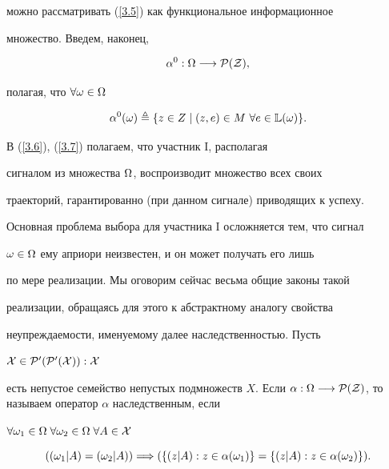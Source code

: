 можно рассматривать (\ref{3.5}) как функциональное информационное


множество. Введем, наконец,


\begin{equation}\label{3.6}


{{\alpha}^0}:\Om \lo \cal{P}(Z),


\end{equation}


полагая, что $\forall{\omega} \in \Omega$


\begin{equation}\label{3.7}


{{\alpha}^0}(\omega) \triangleq \{z \in Z \mid (z,e) \in M \ \fo{e} \in


\Bbb{L}(\omega)\}.


\end{equation}


В (\ref{3.6}), (\ref{3.7}) полагаем, что участник I, располагая


сигналом из множества $\Omega$, воспроизводит множество всех своих


траекторий, гарантированно (при данном сигнале) приводящих к успеху.


Основная проблема выбора для участника I осложняется тем, что сигнал


$\omega \in \Omega$ ему априори неизвестен, и он может получать его лишь


по мере реализации. Мы оговорим сейчас весьма общие законы такой


реализации, обращаясь для этого к абстрактному аналогу свойства


неупреждаемости, именуемому далее наследственностью. Пусть


$\cal{X} \in {\cal{P}}'({\cal{P}}'(X)):\cal{X}$


есть непустое семейство непустых подмножеств $X$. Если $\alpha:\Om \lo


\cal{P}(Z)$, то называем оператор $\alpha$ наследственным, если


$\forall{{\omega}_1} \in \Omega\;\forall{{\omega}_2} \in \Omega\;\forall{A} \in\cal{X}$


\begin{equation}\label{3.8}


(({{\omega}_1} \vert A) = ({{\omega}_2} \vert A)) \Lo (\{(z


\vert A):z \in {\alpha}({\omega}_1)\} = \{(z \vert A):z \in


{\alpha}({\omega}_2)\}).


\end{equation}


